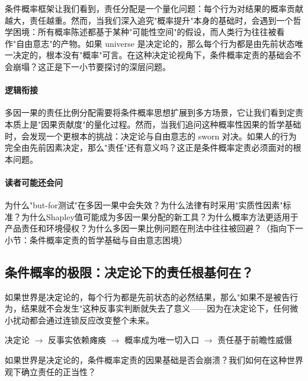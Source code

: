 \documentclass[../main.tex]{subfiles}
\begin{document}
	条件概率框架让我们看到，责任分配是一个量化问题：每个行为对结果的概率贡献越大，责任越重。然而，当我们深入追究"概率提升"本身的基础时，会遇到一个哲学困境：所有概率陈述都基于某种"可能性空间"的假设，而人类行为往往被看作"自由意志"的产物。如果 universe 是决定论的，那么每个行为都是由先前状态唯一决定的，根本没有"概率"可言。在这种决定论视角下，条件概率定责的基础会不会崩塌？这正是下一小节要探讨的深层问题。
	
	\paragraph*{逻辑衔接}

	多因一果的责任比例分配需要将条件概率思想扩展到多方场景，它让我们看到定责本质上是"因果贡献度"的量化过程。然而，当我们追问这种概率性因果的哲学基础时，会发现一个更根本的挑战：决定论与自由意志的 sworn 对决。如果人的行为完全由先前因素决定，那么"责任"还有意义吗？这正是条件概率定责必须面对的根本问题。
	
	\paragraph*{读者可能还会问}

	为什么"but-for测试"在多因一果中会失效？为什么法律有时采用"实质性因素"标准？为什么Shapley值可能成为多因一果分配的新工具？为什么概率方法更适用于产品责任和环境侵权？为什么多因一果比例问题在刑法中往往被回避？（指向下一小节：条件概率定责的哲学基础与自由意志困境）

	\subsection{条件概率的极限：决定论下的责任根基何在？}

	\begin{motivation}

		如果世界是决定论的，每个行为都是先前状态的必然结果，那么"如果不是被告行为，结果就不会发生"这种反事实判断就失去了意义——因为在决定论下，任何微小扰动都会通过连锁反应改变整个未来。

	\end{motivation}
	
	\begin{logicmap}

		决定论 $\rightarrow$ 反事实依赖瘫痪 $\rightarrow$ 概率成为唯一切入口 $\rightarrow$ 责任基于前瞻性威慑

	\end{logicmap}
	
	\begin{questionbox}

		如果世界是决定论的，条件概率定责的因果基础是否会崩溃？我们如何在这种世界观下确立责任的正当性？

	\end{questionbox}
	
\end{document}
